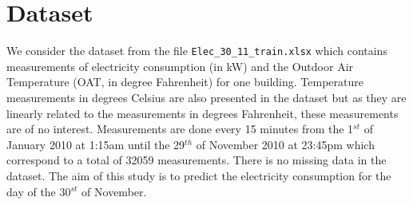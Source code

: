 \section{Dataset}
We consider the dataset from the file \texttt{Elec\_30\_11\_train.xlsx} which contains measurements 
of electricity consumption (in kW) and the Outdoor Air Temperature (OAT, in degree Fahrenheit) for 
one building. Temperature measurements in degrees Celsius are also presented in the dataset but as 
they are linearly related to the measurements in degrees Fahrenheit, these measurements are of no 
interest. Measurements are done every 15 minutes from the 1$^{st}$ of January 2010 at 1:15am until 
the 29$^{th}$ of November 2010 at 23:45pm which correspond to a total of 32059 measurements. There 
is no missing data in the dataset. The aim of this study is to predict the electricity consumption 
for the day of the 30$^{st}$ of November.\\


